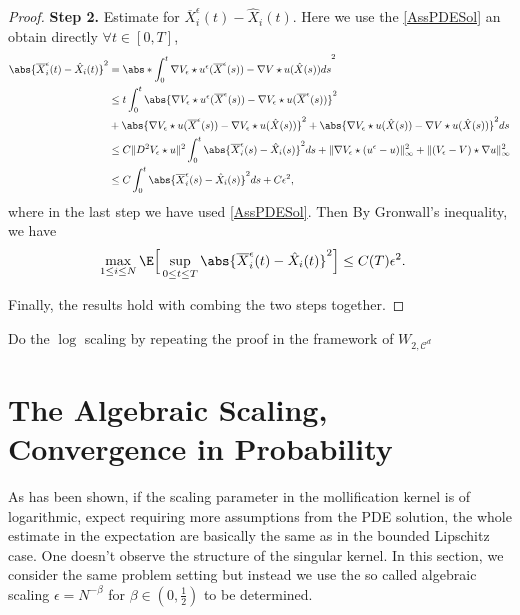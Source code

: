 \begin{proof}
{\bf Step 2.} Estimate for $\overline{X}_i^{\epsilon}(t) - \hat{X}_i(t)   $. Here we use the \autoref{AssPDESol} an obtain directly $\forall t\in [0,T]$,
\begin{align*}
  \abs{\overline{X}_i^{\epsilon}(t) - \hat{X}_i(t)    }^2 &= \abs*{\int_0^{t} \nabla V_{\epsilon} \star  u^{\epsilon}(\overline{X}^{\epsilon} (s))- \nabla V  \star  u(\hat{X}(s)  ) ds }^2\\
                &\le t \int_0^{t} \abs{\nabla V_\epsilon \star  u^{\epsilon}(\overline{X}^{\epsilon}(s)  ) - \nabla V_{\epsilon} \star  u(\overline{X}^{\epsilon}(s)  ) }^2  \\
                 &+ \abs{\nabla V_\epsilon \star  u(\overline{X}^{\epsilon}(s)  ) - \nabla V_{\epsilon} \star  u(\hat{X}(s)  )}^2   + \abs{\nabla V_\epsilon \star u(\hat{X}(s)  ) - \nabla V \star  u(\hat{X}(s)  )}^2 ds\\
                &\le C\|D^2 V_\epsilon \star  u\|^2 \int_0^{t} \abs{\overline{X}_i^{\epsilon}(s) - \hat{X}_i(s) }^2 ds +\|\nabla V_\epsilon \star (u^{\epsilon}-u )\|^2_{\infty}+ \|(V_\epsilon - V) \star  \nabla u\|_{\infty}^2\\
                &\le C\int_0^{t} \abs{\overline{X}_i^{\epsilon}(s) - \hat{X}_i(s) }^2 ds +C \epsilon^2,
\end{align*}
where in the last step we have used \autoref{AssPDESol}.
Then By Gronwall's inequality, we have
\begin{align}\label{barhat}
  \max_{1 \le i \le N}\E\Big[\sup_{0\leq t\leq T}\abs{\overline{X}_i^{\epsilon}(t) - \hat{X}_i(t)    }^2\Big] &\le C(T) \epsilon^2
.\end{align}

Finally, the results hold with combing the two steps together.
\end{proof}
\begin{exercise}
 Do the $\log$ scaling by repeating  the proof in the framework of $ W_{2,\mathcal{C}^{d} }$
\end{exercise}


\section{The Algebraic Scaling, Convergence in Probability}

As has been shown, if the scaling parameter in the mollification kernel is of logarithmic, expect requiring more assumptions from the PDE solution, the whole estimate in the expectation are basically the same as in the bounded Lipschitz case. One doesn't observe the structure of the singular kernel. In this section, we consider the same problem setting but instead we use the so called algebraic scaling $\epsilon = N^{-\beta } $ for $\beta  \in  (0,\frac{1}{2})$ to be determined.
\vskip3mm

